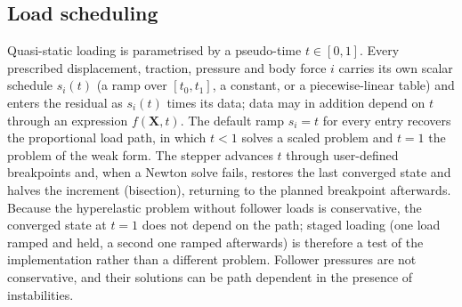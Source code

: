 \documentclass[11pt]{article}
\newcommand{\bX}{\bm{X}}
\begin{document}
\subsection{Load scheduling}

Quasi-static loading is parametrised by a pseudo-time $t \in [0,1]$.  Every
prescribed displacement, traction, pressure and body force $i$ carries its
own scalar schedule $s_i(t)$ (a ramp over $[t_0, t_1]$, a constant, or a
piecewise-linear table) and enters the residual as $s_i(t)$ times its data;
data may in addition depend on $t$ through an expression $f(\bX, t)$.  The
default ramp $s_i = t$ for every entry recovers the proportional load path,
in which $t < 1$ solves a scaled problem and $t = 1$ the problem of the weak
form.  The stepper advances $t$ through user-defined breakpoints and, when a
Newton solve fails, restores the last converged state and halves the
increment (bisection), returning to the planned breakpoint afterwards.
Because the hyperelastic problem without follower loads is conservative,
the converged state at $t = 1$ does not depend on the path; staged loading
(one load ramped and held, a second one ramped afterwards) is therefore a
test of the implementation rather than a different problem.  Follower
pressures are not conservative, and their solutions can be path dependent
in the presence of instabilities.
\end{document}
